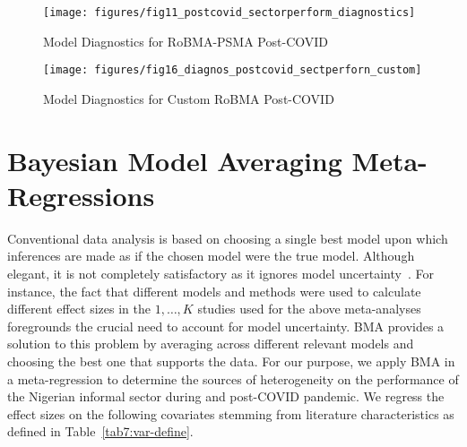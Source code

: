 \documentclass[a4paper, 12pt]{article}
\begin{document}
    \begin{figure}[H]
        \centering
        \texttt{[image: figures/fig11\_postcovid\_sectorperform\_diagnostics]}
        \caption{Model Diagnostics for RoBMA-PSMA Post-COVID}
        \label{fig12:diagnostics-robma-psma-postcovid-sectorperform}
    \end{figure}

    \begin{figure}[H]
        \centering
        \texttt{[image: figures/fig16\_diagnos\_postcovid\_sectperforn\_custom]}
        \caption{Model Diagnostics for Custom RoBMA Post-COVID}
        \label{fig13:diagnostics-custom-postcovid-sectorperform}
    \end{figure}


    \section{Bayesian Model Averaging Meta-Regressions}\label{sec4:meta-regression-methods-analyses}
    Conventional data analysis is based on choosing a single best model upon which inferences are made as if the chosen model were the true model. Although elegant, it is not completely satisfactory as it ignores model uncertainty~\parencites{madigan1995, draper1995, raftery1993, rafteryetal1993}. For instance, the fact that different models and methods were used to calculate different effect sizes in the $1, \dots, K$ studies used for the above meta-analyses foregrounds the crucial need to account for model uncertainty. BMA provides a solution to this problem by averaging across different relevant models and choosing the best one that supports the data. For our purpose, we apply BMA in a meta-regression to determine the sources of heterogeneity on the performance of the Nigerian informal sector during and post-COVID pandemic. We regress the effect sizes on the following covariates stemming from literature characteristics as defined in Table~\ref{tab7:var-define}.
\end{document}
